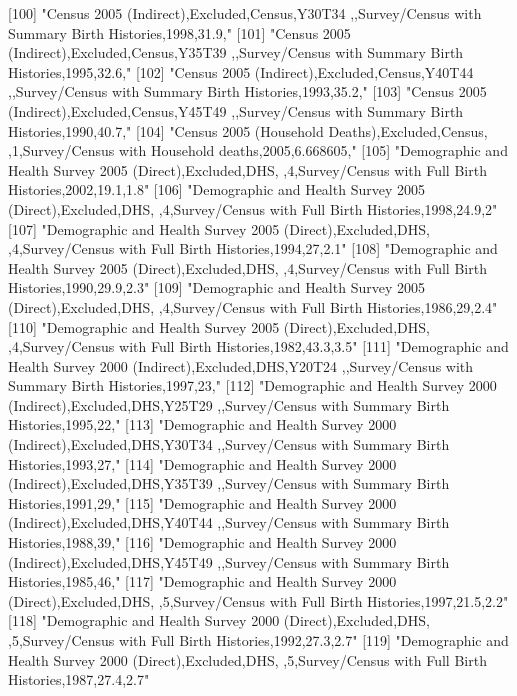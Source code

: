 [100] "Census 2005 (Indirect),Excluded,Census,Y30T34 ,,Survey/Census with Summary Birth Histories,1998,31.9,"                        
[101] "Census 2005 (Indirect),Excluded,Census,Y35T39 ,,Survey/Census with Summary Birth Histories,1995,32.6,"                        
[102] "Census 2005 (Indirect),Excluded,Census,Y40T44 ,,Survey/Census with Summary Birth Histories,1993,35.2,"                        
[103] "Census 2005 (Indirect),Excluded,Census,Y45T49 ,,Survey/Census with Summary Birth Histories,1990,40.7,"                        
[104] "Census 2005 (Household Deaths),Excluded,Census, ,1,Survey/Census with Household deaths,2005,6.668605,"                        
[105] "Demographic and Health Survey 2005 (Direct),Excluded,DHS, ,4,Survey/Census with Full Birth Histories,2002,19.1,1.8"           
[106] "Demographic and Health Survey 2005 (Direct),Excluded,DHS, ,4,Survey/Census with Full Birth Histories,1998,24.9,2"             
[107] "Demographic and Health Survey 2005 (Direct),Excluded,DHS, ,4,Survey/Census with Full Birth Histories,1994,27,2.1"             
[108] "Demographic and Health Survey 2005 (Direct),Excluded,DHS, ,4,Survey/Census with Full Birth Histories,1990,29.9,2.3"           
[109] "Demographic and Health Survey 2005 (Direct),Excluded,DHS, ,4,Survey/Census with Full Birth Histories,1986,29,2.4"             
[110] "Demographic and Health Survey 2005 (Direct),Excluded,DHS, ,4,Survey/Census with Full Birth Histories,1982,43.3,3.5"           
[111] "Demographic and Health Survey 2000 (Indirect),Excluded,DHS,Y20T24 ,,Survey/Census with Summary Birth Histories,1997,23,"      
[112] "Demographic and Health Survey 2000 (Indirect),Excluded,DHS,Y25T29 ,,Survey/Census with Summary Birth Histories,1995,22,"      
[113] "Demographic and Health Survey 2000 (Indirect),Excluded,DHS,Y30T34 ,,Survey/Census with Summary Birth Histories,1993,27,"      
[114] "Demographic and Health Survey 2000 (Indirect),Excluded,DHS,Y35T39 ,,Survey/Census with Summary Birth Histories,1991,29,"      
[115] "Demographic and Health Survey 2000 (Indirect),Excluded,DHS,Y40T44 ,,Survey/Census with Summary Birth Histories,1988,39,"      
[116] "Demographic and Health Survey 2000 (Indirect),Excluded,DHS,Y45T49 ,,Survey/Census with Summary Birth Histories,1985,46,"      
[117] "Demographic and Health Survey 2000 (Direct),Excluded,DHS, ,5,Survey/Census with Full Birth Histories,1997,21.5,2.2"           
[118] "Demographic and Health Survey 2000 (Direct),Excluded,DHS, ,5,Survey/Census with Full Birth Histories,1992,27.3,2.7"           
[119] "Demographic and Health Survey 2000 (Direct),Excluded,DHS, ,5,Survey/Census with Full Birth Histories,1987,27.4,2.7"           
